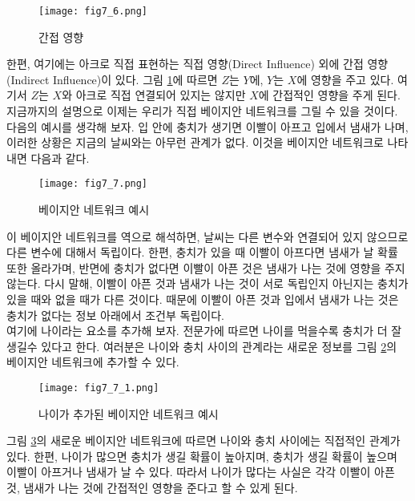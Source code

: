 \documentclass[a4paper]{oblivoir}
\begin{document}
\begin{figure}[ht] \centering 
\texttt{[image: fig7\_6.png]} 
\caption{간접 영향}
\label{fig:7-6}
\end{figure} 

한편, 여기에는 아크로 직접 표현하는 직접 영향(Direct Influence) 외에 간접 영향(Indirect Influence)이 있다. 그림 \ref{fig:7-6}에 따르면 $Z$는 $Y$에, $Y$는 $X$에 영향을 주고 있다. 여기서 $Z$는 $X$와 아크로 직접 연결되어 있지는 않지만 $X$에 간접적인 영향을 주게 된다. \\

지금까지의 설명으로 이제는 우리가 직접 베이지안 네트워크를 그릴 수 있을 것이다. 다음의 예시를 생각해 보자. 입 안에 충치가 생기면 이빨이 아프고 입에서 냄새가 나며, 이러한 상황은 지금의 날씨와는 아무런 관계가 없다. 이것을 베이지안 네트워크로 나타내면 다음과 같다.  \\
\begin{figure}[ht] \centering 
\texttt{[image: fig7\_7.png]} 
\caption{베이지안 네트워크 예시}
\label{fig:7-7}
\end{figure} 

\noindent 이 베이지안 네트워크를 역으로 해석하면, 날씨는 다른 변수와 연결되어 있지 않으므로 다른 변수에 대해서 독립이다. 한편, 충치가 있을 때 이빨이 아프다면 냄새가 날 확률 또한 올라가며, 반면에 충치가 없다면 이빨이 아픈 것은 냄새가 나는 것에 영향을 주지 않는다. 다시 말해, 이빨이 아픈 것과 냄새가 나는 것이 서로 독립인지 아닌지는 충치가 있을 때와 없을 때가 다른 것이다. 때문에 이빨이 아픈 것과 입에서 냄새가 나는 것은 충치가 없다는 정보 아래에서 조건부 독립이다. \\

여기에 나이라는 요소를 추가해 보자. 전문가에 따르면 나이를 먹을수록 충치가 더 잘 생길수 있다고 한다. 여러분은 나이와 충치 사이의 관계라는 새로운 정보를 그림 \ref{fig:7-7}의 베이지안 네트워크에 추가할 수 있다. \\

\begin{figure}[ht] \centering 
\texttt{[image: fig7\_7\_1.png]} 
\caption{나이가 추가된 베이지안 네트워크 예시}
\label{fig:7-7-1}
\end{figure} 

\noindent 그림 \ref{fig:7-7-1}의 새로운 베이지안 네트워크에 따르면 나이와 충치 사이에는 직접적인 관계가 있다. 한편, 나이가 많으면 충치가 생길 확률이 높아지며, 충치가 생길 확률이 높으며 이빨이 아프거나 냄새가 날 수 있다. 따라서 나이가 많다는 사실은 각각 이빨이 아픈 것, 냄새가 나는 것에 간접적인 영향을 준다고 할 수 있게 된다. \\
\end{document}
